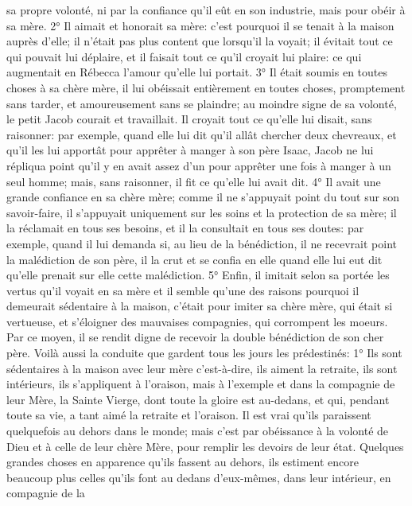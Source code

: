 sa propre volonté, ni par la confiance qu'il eût en son industrie, mais pour obéir à sa mère.
 2° Il aimait et honorait sa mère: c'est pourquoi il se tenait à la maison auprès d'elle; il n'était pas plus content
que lorsqu'il la voyait; il évitait tout ce qui pouvait lui déplaire, et il faisait tout ce qu'il croyait lui plaire: ce qui
augmentait en Rébecca l'amour qu'elle lui portait.
 3° Il était soumis en toutes choses à sa chère mère, il lui obéissait entièrement en toutes choses,
promptement sans tarder, et amoureusement sans se plaindre; au moindre signe de sa volonté, le petit Jacob
courait et travaillait. Il croyait tout ce qu'elle lui disait, sans raisonner: par exemple, quand elle lui dit qu'il allât
chercher deux chevreaux, et qu'il les lui apportât pour apprêter à manger à son père Isaac, Jacob ne lui répliqua
point qu'il y en avait assez d'un pour apprêter une fois à manger à un seul homme; mais, sans raisonner, il fit ce
qu'elle lui avait dit.
 4° Il avait une grande confiance en sa chère mère; comme il ne s'appuyait point du tout sur son savoir-faire, il
s'appuyait uniquement sur les soins et la protection de sa mère; il la réclamait en tous ses besoins, et il la
consultait en tous ses doutes: par exemple, quand il lui demanda si, au lieu de la bénédiction, il ne recevrait point
la malédiction de son père, il la crut et se confia en elle quand elle lui eut dit qu'elle prenait sur elle cette
malédiction.
 5° Enfin, il imitait selon sa portée les vertus qu'il voyait en sa mère et il semble qu'une des raisons pourquoi il
demeurait sédentaire à la maison, c'était pour imiter sa chère mère, qui était si vertueuse, et s'éloigner des
mauvaises compagnies, qui corrompent les moeurs. Par ce moyen, il se rendit digne de recevoir la double
bénédiction de son cher père.
 Voilà aussi la conduite que gardent tous les jours les prédestinés:
1° Ils sont sédentaires à la maison avec leur mère c'est-à-dire, ils aiment la retraite, ils sont intérieurs, ils
s'appliquent à l'oraison, mais à l'exemple et dans la compagnie de leur Mère, la Sainte Vierge, dont toute la gloire
est au-dedans, et qui, pendant toute sa vie, a tant aimé la retraite et l'oraison. Il est vrai qu'ils paraissent
quelquefois au dehors dans le monde; mais c'est par obéissance à la volonté de Dieu et à celle de leur chère
Mère, pour remplir les devoirs de leur état. Quelques grandes choses en apparence qu'ils fassent au dehors, ils
estiment encore beaucoup plus celles qu'ils font au dedans d'eux-mêmes, dans leur intérieur, en compagnie de la

